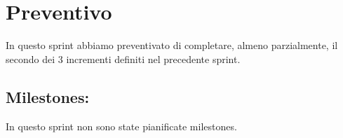 \section{Preventivo}

In questo sprint abbiamo preventivato di completare, almeno parzialmente, il secondo dei 3 incrementi definiti nel precedente sprint.

\subsection{Milestones:}  

In questo sprint non sono state pianificate milestones.